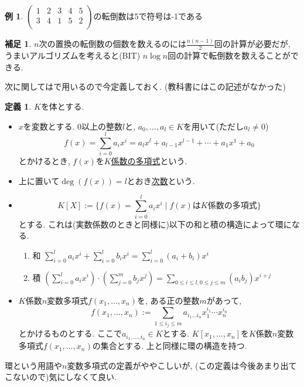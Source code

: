 \documentclass[dvipdfmx,a4paper,11pt]{article} %
\theoremstyle{definition}
\newtheorem{dfn}[thm]{定義}
\newtheorem{rem}[thm]{補足}
\newtheorem{exa}[thm]{例}
\begin{document}
\begin{exa}\cite[例 3.1.3]{O}
$ \begin{pmatrix}
 1& 2  &3 & 4 & 5\\
 3& 4 &1  &5 &2\\
 \end{pmatrix} $の転倒数は5で符号は-1である
\end{exa}
\begin{rem}
$n$次の置換の転倒数の個数を数えるのには$\frac{n(n-1)}{2}$回の計算が必要だが, うまいアルゴリズムを考えると(BIT)
$n \log n$回の計算で転倒数を数えることができる. 
\end{rem}

次に関しては\cite[3.5節]{O}で用いるので今定義しておく. (教科書にはこの記述がなかった)
\begin{dfn}
$K$を体とする. 
\begin{itemize}
\item  $x$を変数とする. 0以上の整数$l$と, $a_0, \ldots, a_l \in K$を用いて(ただし$a_l \neq 0$)
$$
f(x)=\sum_{i=0}^{l} a_i x^i =a_l x^{l} + a_{l-1} x^{l-1} +  \cdots + a_1 x^1 + a_0
$$
とかけるとき, $f(x)$を\underline{$K$係数の多項式}という. 
\item 上に置いて$\deg(f(x))=l$とおき\underline{次数}という. 
\item 
$$
K[X]:=\{ f(x)=\sum_{i=0}^{l} a_i x^i \mid \text{$f(x)$は$K$係数の多項式}\}
$$
とする. これは(実数係数のときと同様に)以下の和と積の構造によって環になる. 
\begin{enumerate}
\item 和 $\sum_{i=0}^{l} a_i x^i  + \sum_{i=0}^{l} b_i x^i =  \sum_{i=0}^{l} (a_i +b_i )x^i $
\item 積 $(\sum_{i=0}^{l} a_i x^i ) \cdot  (\sum_{j=0}^{m} b_j x^j)
=  \sum_{0\le i \le l,  0 \le j \le m} (a_{i}b_{j})x^{i+j}$
\end{enumerate}

\item 
$K$係数$n$変数多項式$f(x_1, \ldots, x_n)$を, ある正の整数$m$があって, 
$$
f(x_1, \ldots, x_n):=\sum_{1 \le i_j \le m} a_{i_1 \ldots i_n}x_{1}^{i_1} \cdots x_{n}^{i_n}
$$
とかけるものとする. ここで$a_{i_1, \ldots, i_n} \in K$とする. 
$K[x_1, \ldots, x_n]$を$K$係数$n$変数多項式$f(x_1, \ldots, x_n)$の集合とする. 上と同様に環の構造を持つ. 
\end{itemize}
\end{dfn}
環という用語や$n$変数多項式の定義がややこしいが, (この定義は今後あまり出てこないので)気にしなくて良い. 
\end{document}
